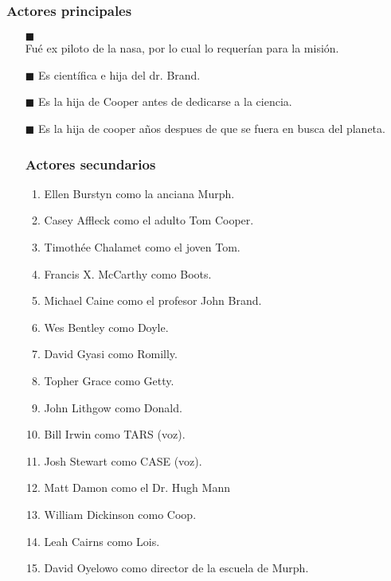 \documentclass[a4paper, 11pt]{article}
\begin{document}
  \subsubsection{Actores principales}
  \begin{itemize}
   \item[$\blacksquare$] \\
   Fué ex piloto de la nasa, por lo cual lo requerían para la misión.
   
   \item[$\blacksquare$] 
   Es científica e hija del dr. Brand.
   \item[$\blacksquare$]
   Es la hija de Cooper antes de dedicarse a la ciencia.
   \item[$\blacksquare$] 
   Es la hija de cooper años despues de que se fuera en busca del planeta.
  
  \subsubsection{Actores secundarios} 
  
  \begin{enumerate}
   \item Ellen Burstyn como la anciana Murph.
   \item Casey Affleck como el adulto Tom Cooper.
   \item Timothée Chalamet como el joven Tom.
   \item Francis X. McCarthy como Boots.
   \item Michael Caine como el profesor John Brand.
   \item Wes Bentley como Doyle.
   \item David Gyasi como Romilly.
   \item Topher Grace como Getty.
   \item John Lithgow como Donald.
   \item Bill Irwin como TARS (voz).
   \item Josh Stewart como CASE (voz).
   \item Matt Damon como el Dr. Hugh Mann
   \item William Dickinson como Coop.
   \item Leah Cairns como Lois.
   \item David Oyelowo como director de la escuela de Murph.
  \end{enumerate}
  

\end{itemize}
\end{document}

